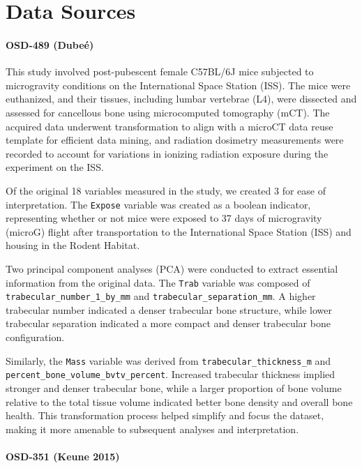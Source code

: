 \documentclass{article}
\begin{document}
\section{Data Sources}

\paragraph{OSD-489 (Dubeé)}

This study involved post-pubescent female C57BL/6J mice subjected to microgravity conditions on the International Space Station (ISS). The mice were euthanized, and their tissues, including lumbar vertebrae (L4), were dissected and assessed for cancellous bone using microcomputed tomography (mCT). The acquired data underwent transformation to align with a microCT data reuse template for efficient data mining, and radiation dosimetry measurements were recorded to account for variations in ionizing radiation exposure during the experiment on the ISS.

Of the original 18 variables measured in the study, we created 3 for ease of interpretation. The \texttt{Expose} variable was created as a boolean indicator, representing whether or not mice were exposed to 37 days of microgravity (microG) flight after transportation to the International Space Station (ISS) and housing in the Rodent Habitat.

Two principal component analyses (PCA) were conducted to extract essential information from the original data. The \texttt{Trab} variable was composed of \texttt{trabecular\_number\_1\_by\_mm} and \texttt{trabecular\_separation\_mm}. A higher trabecular number indicated a denser trabecular bone structure, while lower trabecular separation indicated a more compact and denser trabecular bone configuration.

Similarly, the \texttt{Mass} variable was derived from \texttt{trabecular\_thickness\_m} and \texttt{percent\_bone\_volume\_bvtv\_percent}. Increased trabecular thickness implied stronger and denser trabecular bone, while a larger proportion of bone volume relative to the total tissue volume indicated better bone density and overall bone health. This transformation process helped simplify and focus the dataset, making it more amenable to subsequent analyses and interpretation.


\paragraph{OSD-351 (Keune 2015)}
\end{document}
